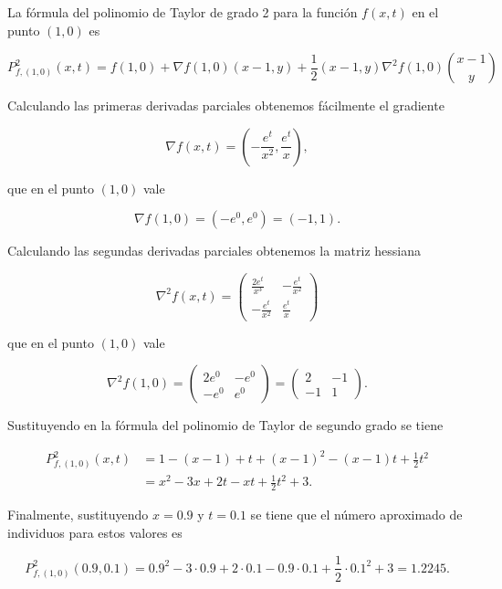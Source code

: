 \documentclass[
  spanish,
  a4paper,
]{scrreport}
\theoremstyle{definition}
\theoremstyle{remark}
\begin{document}
\begin{tcolorbox}[enhanced jigsaw, arc=.35mm, bottomrule=.15mm, bottomtitle=1mm, breakable, colback=white, colbacktitle=quarto-callout-tip-color!10!white, colframe=quarto-callout-tip-color-frame, coltitle=black, left=2mm, leftrule=.75mm, opacityback=0, opacitybacktitle=0.6, rightrule=.15mm, title=\textcolor{quarto-callout-tip-color}{\faLightbulb}\hspace{0.5em}{Solución}, titlerule=0mm, toprule=.15mm, toptitle=1mm]

La fórmula del polinomio de Taylor de grado 2 para la función \(f(x,t)\)
en el punto \((1,0)\) es

\[
P^2_{f,(1,0)}(x,t) = f(1,0) + \nabla f(1,0)(x-1, y) + \frac{1}{2} (x-1, y)\nabla^2 f(1,0)\binom{x-1}{y}
\]

Calculando las primeras derivadas parciales obtenemos fácilmente el
gradiente

\[
\nabla f(x,t) = \left(-\frac{e^t}{x^2}, \frac{e^t}{x}\right),
\]

que en el punto \((1,0)\) vale

\[
\nabla f(1,0) = (-e^0, e^0) = (-1, 1).
\]

Calculando las segundas derivadas parciales obtenemos la matriz hessiana

\[
\nabla^2 f(x,t)
= \begin{pmatrix}
\frac{2e^t}{x^3} & -\frac{e^t}{x^2} \\
-\frac{e^t}{x^2} & \frac{e^t}{x}
\end{pmatrix}
\]

que en el punto \((1,0)\) vale

\[
\nabla^2 f(1,0) 
= \begin{pmatrix}
2e^0 & -e^0 \\
-e^0 & e^0
\end{pmatrix} 
= \begin{pmatrix}
2 & -1 \\
-1 & 1
\end{pmatrix}.
\]

Sustituyendo en la fórmula del polinomio de Taylor de segundo grado se
tiene

\begin{align*}
P^2_{f,(1,0)}(x,t) 
&= 1 - (x-1) + t + (x-1)^2 - (x-1)t + \frac{1}{2}t^2 \\
&= x^2 -3x + 2t -xt + \frac{1}{2}t^2 + 3.
\end{align*}

Finalmente, sustituyendo \(x=0.9\) y \(t=0.1\) se tiene que el número
aproximado de individuos para estos valores es

\[
P^2_{f,(1,0)}(0.9,0.1) = 0.9^2 -3\cdot 0.9 + 2\cdot 0.1 -0.9\cdot 0.1 + \frac{1}{2}\cdot 0.1^2 + 3 = 1.2245.
\]

\end{tcolorbox}
\end{document}
